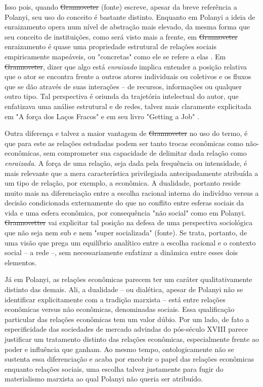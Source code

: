 Isso pois, quando \sout{Grannoveter} (fonte) escreve, apesar da breve referência a Polanyi, seu uso do conceito é bastante distinto. Enquanto em Polanyi
a ideia de enraizamento opera num nível de abstração mais elevado, da
mesma forma que seu conceito de instituições, como será visto mais a frente, em \sout{Grannoveter} enraizamento é quase uma propriedade estrutural
de relações sociais empiricamente mapeáveis, ou "concretas" como ele se refere a elas . Em \sout{Grannoveter}, dizer que algo
está \emph{enraizado} implica entender a posição relativa que o ator se
encontra frente a outros atores individuais ou coletivos e os fluxos
que se dão através de suas interações -- de recursos, informações ou
qualquer outro tipo. Tal perspectiva é oriunda da trajetória
intelectual do autor, que enfatizava uma análise estrutural e de redes, talvez
mais claramente explicitada em "A força dos Laços Fracos"  e em seu livro "Getting a Job" .

Outra diferença e talvez a maior vantagem de \sout{Grannoveter} no uso do termo, é que para este as relações estudadas podem ser tanto
trocas econômicas como não-econômicas, sem comprometer sua capacidade de delimitar dada relação como \emph{enraizada}. A força de uma relação, seja dada pela frequência ou intensidade, é mais relevante que a mera característica privilegiada antecipadamente atribuída a um tipo de relação, por exemplo, a econômica. A dualidade, portanto reside muito mais na
diferenciação entre a escolha racional interna do indivíduo versus
a decisão condicionada externamente do que no conflito entre esferas sociais da vida e uma esfera econômica, por consequência "não social" como em Polanyi. \sout{Grannovetter} vai explicitar tal posição
na defesa de uma perspectiva sociológica que não seja nem sub e nem
"super socializada" (fonte). Se trata, portanto, de uma visão que prega um equilíbrio analítico entre a escolha racional e o contexto social -- a rede --,
sem necessariamente enfatizar a dinâmica entre esses dois elementos.

Já em Polanyi, as relações econômicas parecem ter um caráter qualitativamente distinto das demais. Ali, a dualidade -- ou dialética, apesar de Polanyi não se identificar explicitamente
com a tradição marxista -- está entre relações econômicas versus não econômicas, denominadas sociais. Essa qualificação particular das
relações econômicas tem um valor dúbio. Por um lado, de fato a especificidade das sociedades de mercado advindas do pós-século XVIII
parece justificar um tratamento distinto das relações econômicas, especialmente frente ao poder e influência que ganham. Ao mesmo tempo, ontologicamente não se sustenta essa diferenciação e acaba por encobrir o papel das relações econômicas
enquanto relações sociais, uma escolha talvez justamente para fugir do materialismo marxista ao qual Polanyi não queria ser atribuído.

